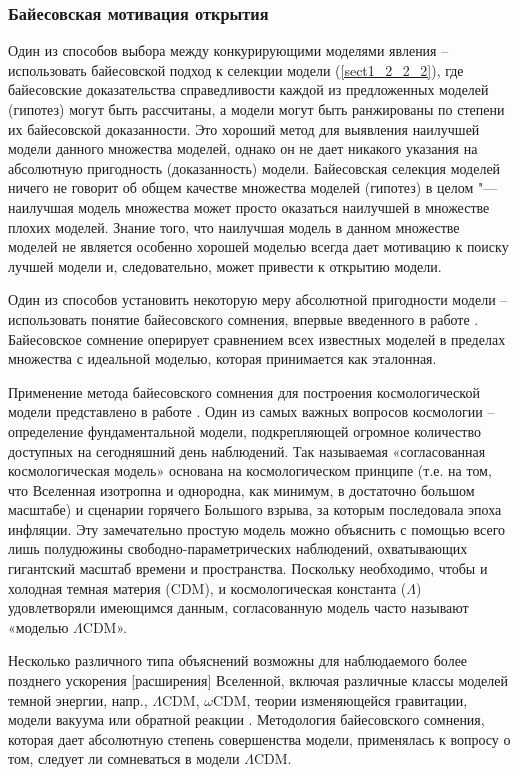 \subsubsection{Байесовская мотивация открытия }\label{sect1_2_3_2}
Один из способов выбора между конкурирующими моделями явления – использовать байесовской подход к селекции модели 
(\cref{sect1_2_2_2}), где байесовские доказательства справедливости каждой из предложенных моделей (гипотез) могут быть 
рассчитаны, а модели могут быть ранжированы по степени их байесовской доказанности. Это хороший метод для выявления 
наилучшей модели данного множества моделей, однако он не дает никакого указания на абсолютную пригодность 
(доказанность) модели. Байесовская селекция моделей ничего не говорит об общем качестве множества моделей (гипотез) 
в целом "--- наилучшая модель множества может просто оказаться наилучшей в множестве плохих моделей. Знание того, что 
наилучшая модель в данном множестве моделей не является особенно хорошей моделью всегда дает мотивацию к поиску лучшей 
модели и, следовательно, может привести к открытию модели.

Один из способов установить некоторую меру абсолютной пригодности модели – использовать понятие байесовского сомнения, 
впервые введенного в работе \cite{starkman2008introducing}. Байесовское сомнение оперирует сравнением всех известных 
моделей в пределах множества с идеальной моделью, которая принимается как эталонная.

Применение метода байесовского сомнения для построения космологической модели представлено в работе 
\cite{march2011should, march2013advanced}. Один из самых важных вопросов космологии – определение фундаментальной 
модели, подкрепляющей огромное количество доступных на сегодняшний день наблюдений. Так называемая «согласованная 
космологическая модель» основана на космологическом принципе (т.е. на том, что Вселенная изотропна и однородна, 
как минимум, в достаточно большом масштабе) и сценарии горячего Большого взрыва, за которым последовала эпоха инфляции. 
Эту замечательно простую модель можно объяснить с помощью всего лишь полудюжины свободно-параметрических наблюдений, 
охватывающих гигантский масштаб времени и пространства. Поскольку необходимо, чтобы и холодная темная материя (CDM), 
и космологическая константа ($\Lambda$) удовлетворяли имеющимся данным, согласованную модель часто 
называют «моделью $\Lambda$CDM». 

Несколько различного типа объяснений возможны для наблюдаемого более позднего ускорения [расширения] Вселенной, включая 
различные классы моделей темной энергии, напр., $\Lambda$CDM, $\omega$CDM, теории изменяющейся гравитации, модели 
вакуума или обратной реакции \cite{march2011should}. Методология байесовского сомнения, которая дает абсолютную 
степень совершенства модели, применялась к вопросу о том, следует ли сомневаться в модели $\Lambda$CDM.

